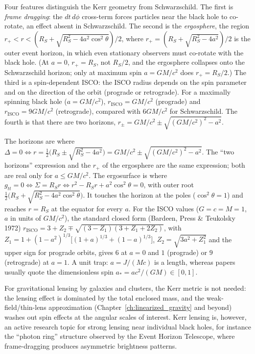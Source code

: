 Four features distinguish the Kerr geometry from Schwarzschild.
The first is \emph{frame dragging}: the $dt\,d\phi$ cross-term forces
particles near the black hole to co-rotate, an effect
absent in Schwarzschild.
The second is the \emph{ergosphere}, the region
$r_+ < r < (R_S + \sqrt{R_S^2 - 4a^2\cos^2\theta})/2$,
where $r_+ = (R_S + \sqrt{R_S^2 - 4a^2})/2$ is the outer
event horizon, in which even stationary observers must co-rotate
with the black hole.  (At $a = 0$, $r_+ = R_S$, not
$R_S/2$, and the ergosphere collapses onto the Schwarzschild
horizon; only at maximum spin $a = GM/c^2$ does $r_+ = R_S/2$.)
The third is a spin-dependent ISCO: the ISCO radius depends on the spin
parameter and on the direction of the orbit (prograde or retrograde).
For a maximally spinning black hole ($a = GM/c^2$),
$r_{\mathrm{ISCO}} = GM/c^2$ (prograde) and
$r_{\mathrm{ISCO}} = 9GM/c^2$ (retrograde), compared with
$6GM/c^2$ for Schwarzschild.
The fourth is that there are two horizons,
$r_\pm = GM/c^2 \pm \sqrt{(GM/c^2)^2 - a^2}$.

\begin{annotation}
The horizons are where $\Delta = 0 \iff
r = \tfrac12\bigl(R_S \pm \sqrt{R_S^2 - 4a^2}\bigr)
= GM/c^2 \pm \sqrt{(GM/c^2)^2 - a^2}$.  The ``two horizons''
expression and the $r_+$ of the ergosphere are the same
expression; both are real only for $a \le GM/c^2$.
The ergosurface is where $g_{tt} = 0 \iff \Sigma = R_Sr \iff
r^2 - R_Sr + a^2\cos^2\theta = 0$, with outer root
$\tfrac12\bigl(R_S + \sqrt{R_S^2 - 4a^2\cos^2\theta}\bigr)$.  It
touches the horizon at the poles ($\cos^2\theta = 1$) and reaches
$r = R_S$ at the equator for every $a$.
For the ISCO values ($G = c = M = 1$, $a$ in units of
$GM/c^2$), the standard closed form (Bardeen, Press \&
Teukolsky 1972)
$r_{\mathrm{ISCO}} = 3 + Z_2 \mp \sqrt{(3 - Z_1)(3 + Z_1 + 2Z_2)}$,
with $Z_1 = 1 + (1 - a^2)^{1/3}\bigl[(1 + a)^{1/3} + (1 - a)^{1/3}\bigr]$,
$Z_2 = \sqrt{3a^2 + Z_1^2}$ and the upper sign for prograde orbits,
gives $6$ at $a = 0$ and $1$ (prograde) or $9$ (retrograde) at
$a = 1$.
A unit trap: $a = J/(Mc)$ is a length, whereas papers usually
quote the dimensionless spin $a_* = ac^2/(GM) \in [0, 1]$.
\end{annotation}


\begin{remark}
For gravitational lensing by galaxies and clusters, the Kerr metric is
not needed: the lensing effect is dominated by the total enclosed mass,
and the weak-field/thin-lens approximation (Chapter~\ref{ch:linearized_gravity} and beyond) washes
out spin effects at the angular scales of interest.  Kerr lensing
is, however, an active research topic for strong lensing near individual
black holes, for instance the ``photon ring'' structure observed by
the Event Horizon Telescope, where frame-dragging produces asymmetric
brightness patterns.
\end{remark}


